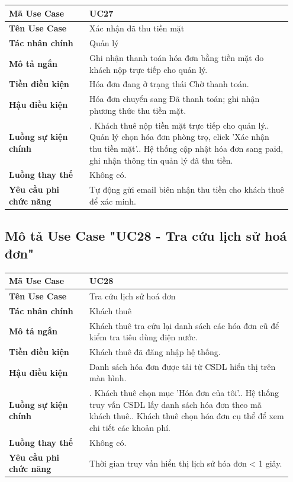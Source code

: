 \begin{longtable}[]{@{}>{\RaggedRight\arraybackslash}p{0.27\linewidth}>{\RaggedRight\arraybackslash}p{0.68\linewidth}@{}}
\toprule
\textbf{Mã Use Case} & UC27\tabularnewline
\midrule
\endhead
\textbf{Tên Use Case} & Xác nhận đã thu tiền mặt\tabularnewline
\textbf{Tác nhân chính} & Quản lý\tabularnewline
\textbf{Mô tả ngắn} & Ghi nhận thanh toán hóa đơn bằng tiền mặt do khách
nộp trực tiếp cho quản lý.\tabularnewline
\textbf{Tiền điều kiện} & Hóa đơn đang ở trạng thái Chờ thanh
toán.\tabularnewline
\textbf{Hậu điều kiện} & Hóa đơn chuyển sang Đã thanh toán; ghi nhận
phương thức thu tiền mặt.\tabularnewline
\textbf{Luồng sự kiện chính} & 1. Khách thuê nộp tiền
mặt trực tiếp cho quản lý.\newline 2. Quản lý chọn hóa đơn phòng
trọ, click 'Xác nhận thu tiền mặt'.\newline 3. Hệ thống cập nhật
hóa đơn sang paid, ghi nhận thông tin quản lý đã thu
tiền.\tabularnewline
\textbf{Luồng thay thế} & Không có.\tabularnewline
\textbf{Yêu cầu phi chức năng} & Tự động gửi email biên nhận thu tiền
cho khách thuê để xác minh.\tabularnewline
\bottomrule
\end{longtable}

\subsection{Mô tả Use Case "UC28 - Tra cứu lịch sử hoá đơn"}

\begin{longtable}[]{@{}>{\RaggedRight\arraybackslash}p{0.27\linewidth}>{\RaggedRight\arraybackslash}p{0.68\linewidth}@{}}
\toprule
\textbf{Mã Use Case} & UC28\tabularnewline
\midrule
\endhead
\textbf{Tên Use Case} & Tra cứu lịch sử hoá đơn\tabularnewline
\textbf{Tác nhân chính} & Khách thuê\tabularnewline
\textbf{Mô tả ngắn} & Khách thuê tra cứu lại danh sách các hóa đơn cũ để
kiểm tra tiêu dùng điện nước.\tabularnewline
\textbf{Tiền điều kiện} & Khách thuê đã đăng nhập hệ
thống.\tabularnewline
\textbf{Hậu điều kiện} & Danh sách hóa đơn được tải từ CSDL hiển thị
trên màn hình.\tabularnewline
\textbf{Luồng sự kiện chính} & 1. Khách thuê chọn mục
'Hóa đơn của tôi'.\newline 2. Hệ thống truy vấn CSDL lấy danh sách
hóa đơn theo mã khách thuê.\newline 3. Khách thuê chọn hóa đơn cụ
thể để xem chi tiết các khoản phí.\tabularnewline
\textbf{Luồng thay thế} & Không có.\tabularnewline
\textbf{Yêu cầu phi chức năng} & Thời gian truy vấn hiển thị lịch sử hóa
đơn \textless{} 1 giây.\tabularnewline
\bottomrule
\end{longtable}

